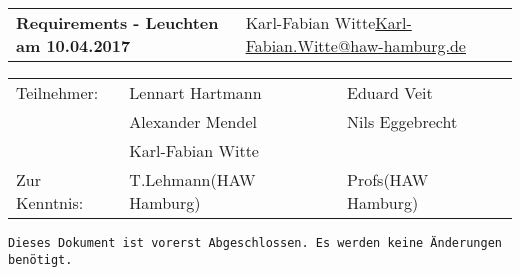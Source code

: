 \documentclass[
   draft=false
  ,paper=a4
  ,twoside=false
  ,fontsize=11pt
  ,headsepline
  ,DIV11
  ,parskip=full+
]{scrartcl} %
\begin{document}

\def\titel{Requirements - Leuchten am 10.04.2017}

\def\myName{Karl-Fabian Witte}
\def\myEmail{Karl-Fabian.Witte@haw-hamburg.de}


\def\teilnehmer{ 
	& Lennart Hartmann & Eduard Veit \\
	& Alexander Mendel   & Nils Eggebrecht\\
    & Karl-Fabian Witte   & \\
}

\def\zurKenntnis {
	& T.Lehmann(HAW Hamburg) & Profs(HAW Hamburg) \\
}



\newlength{\txtw} %
\setlength{\txtw}{\textwidth} %
\addtolength{\txtw}{-10\tabcolsep} %

\def\me{\myName \newline \footnotesize{\url{\myEmail} } }

\def\tablehead{
	\hline 
	\rowcolor{tabgrey}
	\textbf{Typ} & 
	\textbf{Resultat regulär} & 
	\textbf{gewünschte Rutsche voll} \\
	\hline 
	\endhead}

\begin{tabular}{p{0.65\txtw} p{0.35\txtw}}
	\textbf{\Large{\titel}} & \me  \\
\end{tabular}

\begin{tabular}{l p{0.4\txtw} p{0.4\txtw} }
	Teilnehmer: \teilnehmer
	Zur Kenntnis: \zurKenntnis
\end{tabular}
\texttt {Dieses Dokument ist vorerst Abgeschlossen. Es werden keine Änderungen benötigt.}



\def\tablehead{
	\hline 
	\rowcolor{tabgrey}
	\textbf{Typ} & 
	\textbf{Grund des Leuchtens}  
 \\
	\hline 
	\endhead}
\end{document}
